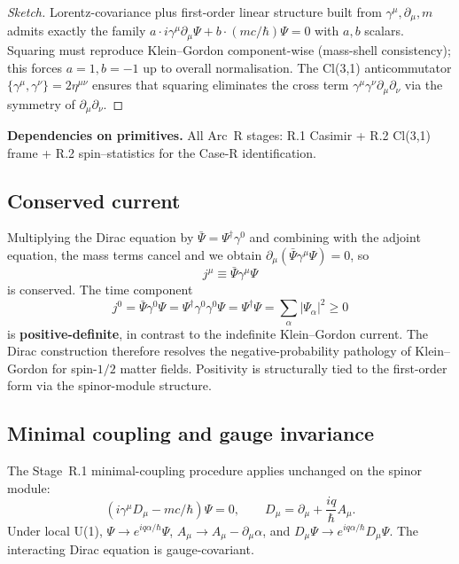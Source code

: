 \documentclass[11pt,a4paper]{article}
\begin{document}
\begin{proof}[Sketch]
Lorentz-covariance plus first-order linear structure built from $\gamma^\mu, \partial_\mu, m$ admits exactly the family $a \cdot i\gamma^\mu \partial_\mu \Psi + b \cdot (mc/\hbar)\Psi = 0$ with $a, b$ scalars. Squaring must reproduce Klein--Gordon component-wise (mass-shell consistency); this forces $a = 1, b = -1$ up to overall normalisation. The Cl(3,1) anticommutator $\{\gamma^\mu, \gamma^\nu\} = 2\eta^{\mu\nu}$ ensures that squaring eliminates the cross term $\gamma^\mu \gamma^\nu \partial_\mu \partial_\nu$ via the symmetry of $\partial_\mu \partial_\nu$.
\end{proof}

\textbf{Dependencies on primitives.} All Arc~R stages: R.1 Casimir + R.2 Cl(3,1) frame + R.2 spin--statistics for the Case-R identification.

\subsection{Conserved current}
\label{sec:current}

Multiplying the Dirac equation by $\bar\Psi = \Psi^\dagger \gamma^0$ and combining with the adjoint equation, the mass terms cancel and we obtain $\partial_\mu (\bar\Psi \gamma^\mu \Psi) = 0$, so
\begin{equation}
j^\mu \equiv \bar\Psi \gamma^\mu \Psi
\end{equation}
is conserved. The time component
\begin{equation}
j^0 = \bar\Psi \gamma^0 \Psi = \Psi^\dagger \gamma^0 \gamma^0 \Psi = \Psi^\dagger \Psi = \sum_\alpha |\Psi_\alpha|^2 \ge 0
\end{equation}
is \textbf{positive-definite}, in contrast to the indefinite Klein--Gordon current. The Dirac construction therefore resolves the negative-probability pathology of Klein--Gordon for spin-$1/2$ matter fields. Positivity is structurally tied to the first-order form via the spinor-module structure.

\subsection{Minimal coupling and gauge invariance}

The Stage~R.1 minimal-coupling procedure applies unchanged on the spinor module:
\begin{equation}
(i\gamma^\mu D_\mu - mc/\hbar)\Psi = 0, \qquad D_\mu = \partial_\mu + \frac{iq}{\hbar} A_\mu.
\end{equation}
Under local U(1), $\Psi \to e^{iq\alpha/\hbar}\Psi$, $A_\mu \to A_\mu - \partial_\mu \alpha$, and $D_\mu \Psi \to e^{iq\alpha/\hbar} D_\mu \Psi$. The interacting Dirac equation is gauge-covariant.
\end{document}
